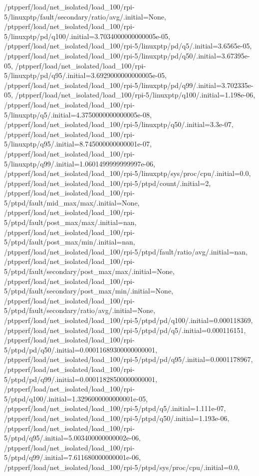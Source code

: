 {    /ptpperf/load/net_isolated/load_100/rpi-5/linuxptp/fault/secondary/ratio/avg/.initial=None,
    /ptpperf/load/net_isolated/load_100/rpi-5/linuxptp/pd/q100/.initial=3.7034000000000005e-05,
    /ptpperf/load/net_isolated/load_100/rpi-5/linuxptp/pd/q5/.initial=3.6565e-05,
    /ptpperf/load/net_isolated/load_100/rpi-5/linuxptp/pd/q50/.initial=3.67395e-05,
    /ptpperf/load/net_isolated/load_100/rpi-5/linuxptp/pd/q95/.initial=3.6929000000000005e-05,
    /ptpperf/load/net_isolated/load_100/rpi-5/linuxptp/pd/q99/.initial=3.702335e-05,
    /ptpperf/load/net_isolated/load_100/rpi-5/linuxptp/q100/.initial=1.198e-06,
    /ptpperf/load/net_isolated/load_100/rpi-5/linuxptp/q5/.initial=4.3750000000000005e-08,
    /ptpperf/load/net_isolated/load_100/rpi-5/linuxptp/q50/.initial=3.3e-07,
    /ptpperf/load/net_isolated/load_100/rpi-5/linuxptp/q95/.initial=8.745000000000001e-07,
    /ptpperf/load/net_isolated/load_100/rpi-5/linuxptp/q99/.initial=1.0601499999999997e-06,
    /ptpperf/load/net_isolated/load_100/rpi-5/linuxptp/sys/proc/cpu/.initial=0.0,
    /ptpperf/load/net_isolated/load_100/rpi-5/ptpd/count/.initial=2,
    /ptpperf/load/net_isolated/load_100/rpi-5/ptpd/fault/mid_max/max/.initial=None,
    /ptpperf/load/net_isolated/load_100/rpi-5/ptpd/fault/post_max/max/.initial=nan,
    /ptpperf/load/net_isolated/load_100/rpi-5/ptpd/fault/post_max/min/.initial=nan,
    /ptpperf/load/net_isolated/load_100/rpi-5/ptpd/fault/ratio/avg/.initial=nan,
    /ptpperf/load/net_isolated/load_100/rpi-5/ptpd/fault/secondary/post_max/max/.initial=None,
    /ptpperf/load/net_isolated/load_100/rpi-5/ptpd/fault/secondary/post_max/min/.initial=None,
    /ptpperf/load/net_isolated/load_100/rpi-5/ptpd/fault/secondary/ratio/avg/.initial=None,
    /ptpperf/load/net_isolated/load_100/rpi-5/ptpd/pd/q100/.initial=0.000118369,
    /ptpperf/load/net_isolated/load_100/rpi-5/ptpd/pd/q5/.initial=0.000116151,
    /ptpperf/load/net_isolated/load_100/rpi-5/ptpd/pd/q50/.initial=0.00011689300000000001,
    /ptpperf/load/net_isolated/load_100/rpi-5/ptpd/pd/q95/.initial=0.0001178967,
    /ptpperf/load/net_isolated/load_100/rpi-5/ptpd/pd/q99/.initial=0.00011828500000000001,
    /ptpperf/load/net_isolated/load_100/rpi-5/ptpd/q100/.initial=1.3296000000000001e-05,
    /ptpperf/load/net_isolated/load_100/rpi-5/ptpd/q5/.initial=1.111e-07,
    /ptpperf/load/net_isolated/load_100/rpi-5/ptpd/q50/.initial=1.193e-06,
    /ptpperf/load/net_isolated/load_100/rpi-5/ptpd/q95/.initial=5.003400000000002e-06,
    /ptpperf/load/net_isolated/load_100/rpi-5/ptpd/q99/.initial=7.611680000000001e-06,
    /ptpperf/load/net_isolated/load_100/rpi-5/ptpd/sys/proc/cpu/.initial=0.0,
}
